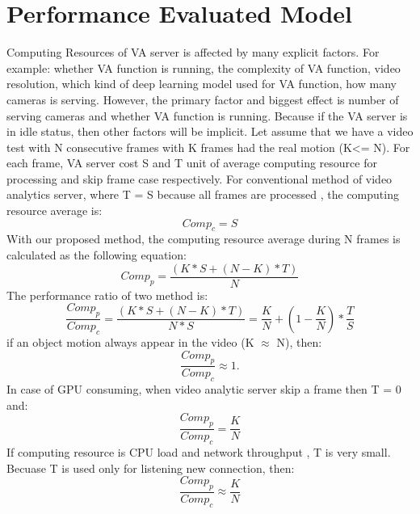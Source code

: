 \section{ Performance Evaluated Model}
Computing Resources of VA server is affected by many explicit factors. For example:  whether VA function is running, the complexity of VA function, video resolution, which kind of deep learning model used for VA function, how many cameras is serving. However, the primary factor and biggest effect is number of serving cameras and whether VA function is running. Because if  the VA server is in idle status, then other factors will be implicit. Let assume that we have a video test with N consecutive frames with K frames had the real motion (K<= N).  For each frame, VA server cost S and T unit  of average computing resource  for processing and skip frame case respectively.
For conventional method  of video analytics server, where T = S because all frames are processed , the computing resource average is:\\
\begin{equation}
\label{eqn:3}
Comp_{c}=S
\end{equation}
With our proposed method, the computing resource average during N frames  is calculated as the following equation:\\
\begin{equation}
\label{eqn:4}
Comp_{p}=\frac{(K*S+(N-K)*T)}{N}
\end{equation}
The performance ratio of two method is: \\
\begin{equation}
\label{eqn:5}
\frac{Comp_{p}}{Comp_{c}}=\frac{(K*S+(N-K)*T)}{N*S}=\frac{K}{N} + (1 - \frac{K}{N})*\frac{T}{S}
\end{equation}
if an object motion always appear in the video (K $\approx$ N), then: \\
\begin{equation}
\label{eqn:6}
 \frac{Comp_{p}}{Comp_{c}}\approx 1.
\end{equation}
In case of GPU consuming, when video analytic server skip a frame then T = 0 and:\\
\begin{equation}
\label{eqn:7}
\frac{Comp_{p}}{Comp_{c}} = \frac{K}{N}
\end{equation}
 If computing resource is CPU load and  network throughput ,  T is very small. Becuase T is used only for listening new connection, then: \\
\begin{equation}
\label{eqn:8}
 \frac{Comp_{p}}{Comp_{c}} \approx \frac{K}{N}
\end{equation}
